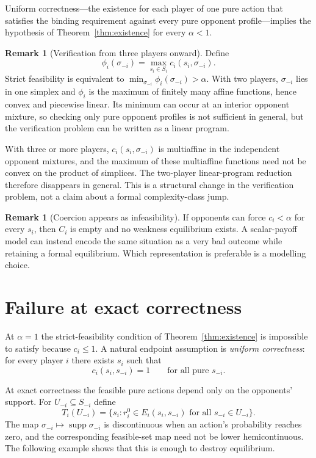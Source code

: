 \documentclass[11pt]{article}
\theoremstyle{definition}
\newtheorem{remark}[theorem]{Remark}
\newcommand{\supp}{\operatorname{supp}}
\begin{document}
Uniform correctness---the existence for each player of one pure action that satisfies the binding requirement against every pure opponent profile---implies the hypothesis of Theorem~\ref{thm:existence} for every $\alpha<1$.

\begin{remark}[Verification from three players onward]
Define
\[
\phi_i(\sigma_{-i})=\max_{s_i\in S_i}c_i(s_i,\sigma_{-i}).
\]
Strict feasibility is equivalent to $\min_{\sigma_{-i}}\phi_i(\sigma_{-i})>\alpha$. With two players, $\sigma_{-i}$ lies in one simplex and $\phi_i$ is the maximum of finitely many affine functions, hence convex and piecewise linear. Its minimum can occur at an interior opponent mixture, so checking only pure opponent profiles is not sufficient in general, but the verification problem can be written as a linear program.

With three or more players, $c_i(s_i,\sigma_{-i})$ is multiaffine in the independent opponent mixtures, and the maximum of these multiaffine functions need not be convex on the product of simplices. The two-player linear-program reduction therefore disappears in general. This is a structural change in the verification problem, not a claim about a formal complexity-class jump.
\end{remark}

\begin{remark}[Coercion appears as infeasibility]
If opponents can force $c_i<\alpha$ for every $s_i$, then $C_i$ is empty and no weakness equilibrium exists. A scalar-payoff model can instead encode the same situation as a very bad outcome while retaining a formal equilibrium. Which representation is preferable is a modelling choice.
\end{remark}

\section{Failure at exact correctness}
At $\alpha=1$ the strict-feasibility condition of Theorem~\ref{thm:existence} is impossible to satisfy because $c_i\le1$. A natural endpoint assumption is \emph{uniform correctness}: for every player $i$ there exists $s_i$ such that
\[
c_i(s_i,s_{-i})=1\qquad\text{for all pure }s_{-i}.
\]

At exact correctness the feasible pure actions depend only on the opponents' support. For $U_{-i}\subseteq S_{-i}$ define
\[
T_i(U_{-i})=\{s_i:r_i^0\in E_i(s_i,s_{-i})\text{ for all }s_{-i}\in U_{-i}\}.
\]
The map $\sigma_{-i}\mapsto\supp\sigma_{-i}$ is discontinuous when an action's probability reaches zero, and the corresponding feasible-set map need not be lower hemicontinuous. The following example shows that this is enough to destroy equilibrium.
\end{document}
